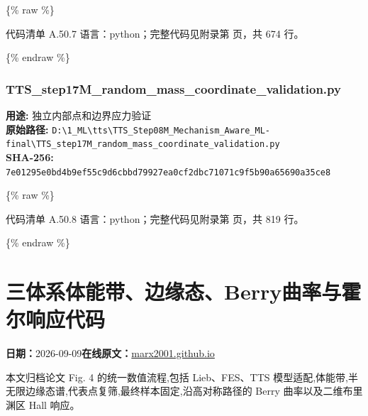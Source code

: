 \documentclass[lang=cn,scheme=chinese,color=blue,device=normal,toc=onecol,math=cm]{elegantbook}
\begin{document}
\{\% raw \%\}\par


\begin{codeindexbox}{代码清单 A.50.7}
语言：python；完整代码见附录第 \pageref{code:50:7} 页，共 674 行。
\end{codeindexbox}


\{\% endraw \%\}\par


\subsubsection{TTS\_\allowbreak{}step17M\_\allowbreak{}random\_\allowbreak{}mass\_\allowbreak{}coordinate\_\allowbreak{}validation.py}


\textbf{用途:} 独立内部点和边界应力验证\\ \textbf{原始路径:} \texttt{D:\textbackslash{}\allowbreak{}1\_\allowbreak{}ML\textbackslash{}\allowbreak{}tts\textbackslash{}\allowbreak{}TTS\_\allowbreak{}Step08M\_\allowbreak{}Mechanism\_\allowbreak{}Aware\_\allowbreak{}ML-final\textbackslash{}\allowbreak{}TTS\_\allowbreak{}step17M\_\allowbreak{}random\_\allowbreak{}mass\_\allowbreak{}coordinate\_\allowbreak{}validation.py}\\ \textbf{SHA-256:} \texttt{7e01295e0bd4b9ef55c9d6cbbd79927ea0cf2dbc71071c9f5b90a65690a35ce8}\par


\{\% raw \%\}\par


\begin{codeindexbox}{代码清单 A.50.8}
语言：python；完整代码见附录第 \pageref{code:50:8} 页，共 819 行。
\end{codeindexbox}


\{\% endraw \%\}\par



\section{三体系体能带、边缘态、Berry曲率与霍尔响应代码}
\begin{articlemeta}
\textbf{日期：}2026-09-09\hfill\textbf{在线原文：}\href{https://marx2001.github.io/sci-note\_posts/20260909-altermagnetic-edge-hall-code/}{marx2001.github.io}
\end{articlemeta}

本文归档论文 Fig. 4 的统一数值流程,包括 Lieb、FES、TTS 模型适配,体能带,半无限边缘态谱,代表点复筛,最终样本固定,沿高对称路径的 Berry 曲率以及二维布里渊区 Hall 响应。\par
\end{document}
